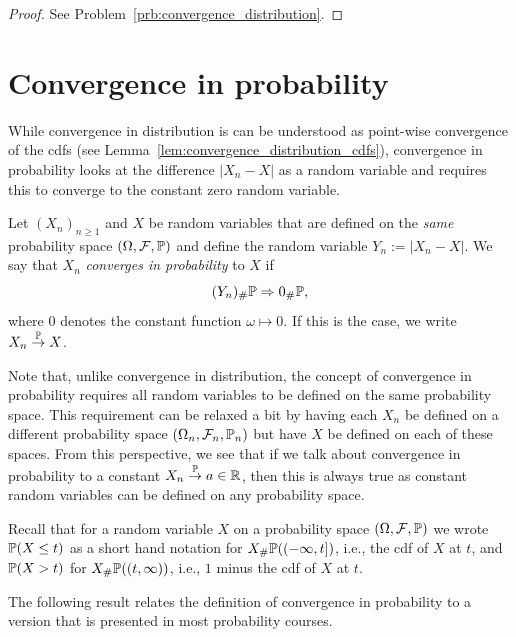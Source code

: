 \begin{proof}
See Problem~\ref{prb:convergence_distribution}.
\end{proof}


\section{Convergence in probability}

While convergence in distribution is can be understood as point-wise convergence of the cdfs (see Lemma~\ref{lem:convergence_distribution_cdfs}), convergence in probability looks at the difference $|X_n - X|$ as a random variable and requires this to converge to the constant zero random variable.

\begin{definition}\label{def:convergence_probability}
Let $(X_n)_{n \ge 1}$ and $X$ be random variables that are defined on the \emph{same} probability space $(\Omega, \mathcal F, \mathbb P)$ and define the random variable $Y_n := |X_n - X|$. We say that $X_n$ \emph{converges in probability} to $X$ if
\[
	(Y_n)_\# \mathbb P \Rightarrow 0_\# \mathbb P,
\] 
where $0$ denotes the constant function $\omega \mapsto 0$. If this is the case, we write $X_n \stackrel{\mathbb P}{\rightarrow} X$.
\end{definition}

\begin{remark}
Note that, unlike convergence in distribution, the concept of convergence in probability requires all random variables to be defined on the same probability space. This requirement can be relaxed a bit by having each $X_n$ be defined on a different probability space $(\Omega_n, \mathcal F_n, \mathbb P_n)$ but have $X$ be defined on each of these spaces. From this perspective, we see that if we talk about convergence in probability to a constant $X_n \stackrel{\mathbb P}{\rightarrow} a \in \mathbb R$, then this is always true as constant random variables can be defined on any probability space.
\end{remark}

Recall that for a random variable $X$ on a probability space $(\Omega, \mathcal F, \mathbb P)$ we wrote $\mathbb P(X \le t)$ as a short hand notation for $X_\# \mathbb P ((-\infty,t])$, i.e., the cdf of $X$ at $t$, and $\mathbb P(X > t)$ for $X_\# \mathbb P ((t,\infty))$, i.e., $1$ minus the cdf of $X$ at $t$.

The following result relates the definition of convergence in probability to a version that is presented in most probability courses.

